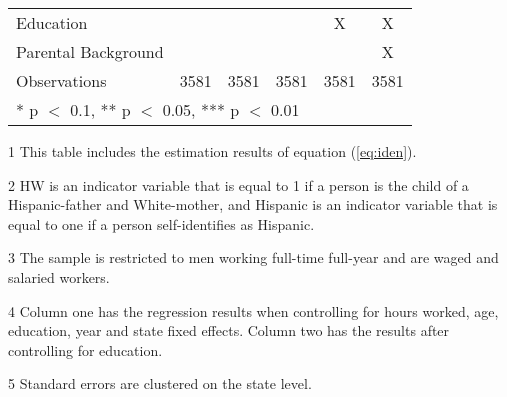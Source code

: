 \begin{table}[H]
{\begin{threeparttable}
\begin{tabular}[t]{lccccc}
Education &  &  &  & X & X\\
Parental Background &  &  &  &  & X\\
Observations & \num{3581} & \num{3581} & \num{3581} & \num{3581} & \num{3581}\\
\bottomrule
\multicolumn{6}{l}{\rule{0pt}{1em}* p $<$ 0.1, ** p $<$ 0.05, *** p $<$ 0.01}\\
\end{tabular}
\begin{tablenotes}
\item[1] \footnotesize{This table includes the estimation results of equation (\ref{eq:iden}).}
\item[2] \footnotesize{HW is an indicator variable that is equal to 1 if a person is the child of a Hispanic-father and White-mother, and Hispanic is an indicator variable that is equal to one if a person self-identifies as Hispanic.}
\item[3] \footnotesize{The sample is restricted to men working full-time full-year and are waged and salaried workers.}
\item[4] \footnotesize{Column one has the regression results when controlling for hours worked, age, education, year and state fixed effects. Column two has the results after controlling for education.}
\item[5] {\footnotesize{Standard errors are clustered on the state level.}}
\end{tablenotes}
\end{threeparttable}}
\end{table}
